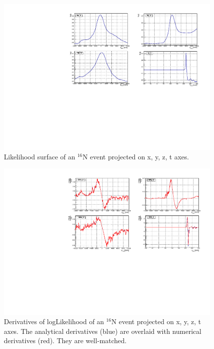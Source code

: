 \begin{figure}
	\centering
    \includegraphics[width=160mm]{logL_xyzt.pdf}
	\caption{Likelihood surface of an {$^{16}$}N event projected on x, y, z, t axes.}
	\label{logLxyz}
\end{figure}

\begin{figure}
	\centering
	\includegraphics[width=160mm]{derivativeLogL_xyzt.pdf}
	\caption{Derivatives of logLikelihood of an {$^{16}$}N event projected on x, y, z, t axes. The analytical derivatives (blue) are overlaid with numerical derivatives (red). They are well-matched.}
	\label{derivative_logLxyz}
\end{figure}





















